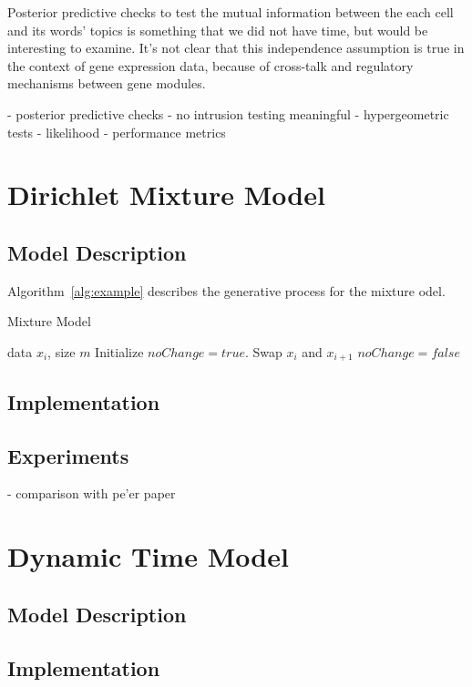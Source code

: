 \documentclass{article}
\begin{document}
Posterior predictive checks to test the mutual information between the each cell and its words' topics is something that we did not have time, but would be interesting to examine. It's not clear that this independence assumption is true in the context of gene expression data, because of cross-talk and regulatory mechanisms between gene modules.


- posterior predictive checks
- no intrusion testing meaningful
- hypergeometric tests
- likelihood
- performance metrics


\section{Dirichlet Mixture Model} 
\label{mmsec}
\subsection{Model Description} 
    Algorithm~\ref{alg:example} describes the generative process for the mixture odel.

    \begin{algorithm}[tb]
       \caption{Mixture Model}
       \label{alg:example}
    \begin{algorithmic}
        data $x_i$, size $m$
       \REPEAT
       \STATE Initialize $noChange = true$.
       \STATE Swap $x_i$ and $x_{i+1}$
       \STATE $noChange = false$
       \ENDIF
       \ENDFOR
    \end{algorithmic}
    \end{algorithm}
\subsection{Implementation} 
\subsection{Experiments}  
- comparison with pe'er paper


\section{Dynamic Time Model} 
\label{dtmsec}
\subsection{Model Description} 
\subsection{Implementation} 
\end{document}
